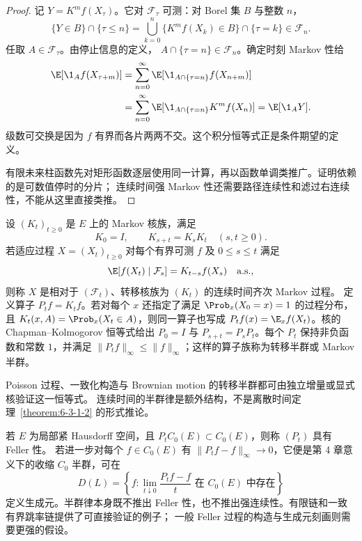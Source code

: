 \begin{proof}
记 $Y=K^mf(X_\tau)$。它对 $\mathcal F_\tau$ 可测：对 Borel 集 $B$ 与整数 $n$，
\[
 \{Y\in B\}\cap\{\tau\leq n\}
 =\bigcup_{k=0}^n\{K^mf(X_k)\in B\}\cap\{\tau=k\}\in\mathcal F_n.
\]
任取 $A\in\mathcal F_\tau$。由停止信息的定义，
$A\cap\{\tau=n\}\in\mathcal F_n$。确定时刻 Markov 性给
\begin{align*}
 \E[\1_Af(X_{\tau+m})]
 &=\sum_{n=0}^\infty
   \E[\1_{A\cap\{\tau=n\}}f(X_{n+m})]\\
 &=\sum_{n=0}^\infty
   \E[\1_{A\cap\{\tau=n\}}K^mf(X_n)]
 =\E[\1_AY].
\end{align*}
级数可交换是因为 $f$ 有界而各片两两不交。这个积分恒等式正是条件期望的定义。

有限未来柱函数先对矩形函数逐层使用同一计算，再以函数单调类推广。证明依赖的是可数值停时的分片；
连续时间强 Markov 性还需要路径连续性和滤过右连续性，不能从这里直接类推。
\end{proof}

\begin{definition}[转移半群]\label{def:6-3-1-3}
设 $(K_t)_{t\geq0}$ 是 $E$ 上的 Markov 核族，满足
\[
 K_0=I,\qquad K_{s+t}=K_sK_t\quad(s,t\geq0).
\]
若适应过程 $X=(X_t)_{t\geq0}$ 对每个有界可测 $f$ 及 $0\leq s\leq t$ 满足
\[
 \E[f(X_t)\mid\mathcal F_s]=K_{t-s}f(X_s)\quad\text{a.s.},
\]
则称 $X$ 是相对于 $(\mathcal F_t)$、转移核族为 $(K_t)$ 的连续时间齐次 Markov 过程。
定义算子 $P_tf=K_tf$。若对每个 $x$ 还指定了满足
$\Prob_x(X_0=x)=1$ 的过程分布，且
$K_t(x,A)=\Prob_x(X_t\in A)$，则同一算子也写成
$P_tf(x)=\E_xf(X_t)$。核的 Chapman--Kolmogorov 恒等式给出
$P_0=I$ 与 $P_{s+t}=P_sP_t$。每个 $P_t$ 保持非负函数和常数 $1$，并满足
$\|P_tf\|_\infty\leq\|f\|_\infty$；这样的算子族称为转移半群或 Markov 半群。
\end{definition}

Poisson 过程、一致化构造与 Brownian motion 的转移半群都可由独立增量或显式核验证这一恒等式。
连续时间的半群律是额外结构，不是离散时间定理~\ref{theorem:6-3-1-2} 的形式推论。

\begin{remark}\label{proposition:6-3-1-4}
若 $E$ 为局部紧 Hausdorff 空间，且 $P_tC_0(E)\subset C_0(E)$，则称 $(P_t)$ 具有 Feller 性。
若进一步对每个 $f\in C_0(E)$ 有 $\|P_tf-f\|_\infty\to0$，它便是第 4 章意义下的收缩
$C_0$ 半群，可在
\[
 D(L)=\left\{f:\lim_{t\downarrow0}\frac{P_tf-f}{t}
 \text{ 在 }C_0(E)\text{ 中存在}\right\}
\]
定义生成元。半群律本身既不推出 Feller 性，也不推出强连续性。有限链和一致有界跳率链提供了可直接验证的例子；
一般 Feller 过程的构造与生成元刻画则需要更强的假设。
\end{remark}

